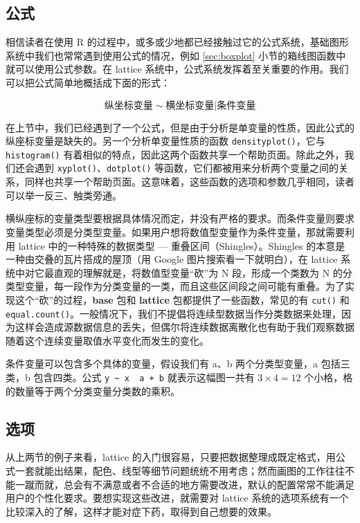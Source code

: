 \documentclass[
  b5paper,
  UTF8,twoside]{book}
\begin{document}
\subsection{公式}\label{ux516cux5f0f}

相信读者在使用 R 的过程中，或多或少地都已经接触过它的公式系统，基础图形系统中我们也常常遇到使用公式的情况，例如 \ref{sec:boxplot} 小节的箱线图函数中就可以使用公式参数。在 lattice 系统中，公式系统发挥着至关重要的作用。我们可以把公式简单地概括成下面的形式：

\[\text{纵坐标变量}\sim\text{横坐标变量}|\text{条件变量}\]

在上节中，我们已经遇到了一个公式，但是由于分析是单变量的性质，因此公式的纵座标变量是缺失的。另一个分析单变量性质的函数 \texttt{densityplot()}，它与 \texttt{histogram()} 有着相似的特点，因此这两个函数共享一个帮助页面。除此之外，我们还会遇到 \texttt{xyplot()}、\texttt{dotplot()} 等函数，它们都被用来分析两个变量之间的关系，同样也共享一个帮助页面。这意味着，这些函数的选项和参数几乎相同，读者可以举一反三、触类旁通。

横纵座标的变量类型要根据具体情况而定，并没有严格的要求。而条件变量则要求变量类型必须是分类型变量。如果用户想将数值型变量作为条件变量，那就需要利用 lattice 中的一种特殊的数据类型 --- 重叠区间（Shingles）。Shingles 的本意是一种由交叠的瓦片搭成的屋顶（用 Google 图片搜索看一下就明白），在 lattice 系统中对它最直观的理解就是，将数值型变量``砍''为 N 段，形成一个类数为 N 的分类型变量，每一段作为分类变量的一类，而且这些区间段之间可能有重叠。为了实现这个``砍''的过程，\textbf{base} 包和 \textbf{lattice} 包都提供了一些函数，常见的有 \texttt{cut()} 和 \texttt{equal.count()}。一般情况下，我们不提倡将连续型数据当作分类数据来处理，因为这样会造成源数据信息的丢失，但偶尔将连续数据离散化也有助于我们观察数据随着这个连续变量取值水平变化而发生的变化。

条件变量可以包含多个具体的变量，假设我们有 a、b 两个分类型变量，a 包括三类，b 包含四类。公式 \texttt{y\ \textasciitilde{}\ x\ \textbar{}\ a\ +\ b} 就表示这幅图一共有 \(3\times4=12\) 个小格，格的数量等于两个分类变量分类数的乘积。

\subsection{选项}\label{ux9009ux9879}

从上两节的例子来看，lattice 的入门很容易，只要把数据整理成既定格式，用公式一套就能出结果，配色、线型等细节问题统统不用考虑；然而画图的工作往往不能一蹴而就，总会有不满意或者不合适的地方需要改进，默认的配置常常不能满足用户的个性化要求。要想实现这些改进，就需要对 lattice 系统的选项系统有一个比较深入的了解，这样才能对症下药，取得到自己想要的效果。
\end{document}
